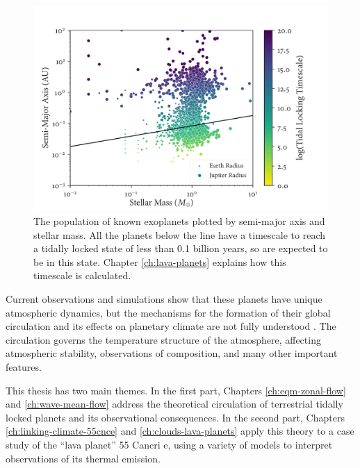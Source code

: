 \begin{figure}
  \centering
    \includegraphics[width=1.0\textwidth]{figures/introduction/tide-locked-population.pdf}
    \caption{The population of known exoplanets plotted by semi-major axis and stellar mass. All the planets below the line have a timescale to reach a tidally locked state of less than 0.1 billion years, so are expected to be in this state. Chapter \ref{ch:lava-planets} explains how this timescale is calculated.}\label{fig:tide-locked-population}
\end{figure}


 Current observations and simulations show that these planets have unique atmospheric dynamics, but the mechanisms for the formation of their global circulation and its effects on planetary climate are not fully understood \citep{heng2015review, pierrehumbert2018review}. The circulation governs the temperature structure of the atmosphere, affecting atmospheric stability, observations of composition, and many other important features.

This thesis has two main themes. In the first part, Chapters \ref{ch:eqm-zonal-flow} and \ref{ch:wave-mean-flow} address the theoretical circulation of terrestrial tidally locked planets and its observational consequences. In the second part, Chapters \ref{ch:linking-climate-55cnce} and \ref{ch:clouds-lava-planets} apply this theory to a case study of the ``lava planet'' 55 Cancri e, using a variety of models to interpret observations of its thermal emission.

